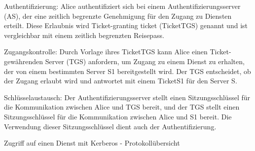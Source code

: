 \documentclass[a4paper]{article}
\begin{document}
\begin{multicols}{3}
\begin{itemize*}
\begin{itemize*}
                  \item Authentifizierung: Alice authentifiziert sich bei einem Authentifizierungsserver (AS), der eine zeitlich begrenzte Genehmigung für den Zugang zu Diensten erteilt. Diese Erlaubnis wird Ticket-granting ticket (TicketTGS) genannt und ist vergleichbar mit einem zeitlich begrenzten Reisepass.
                  \item Zugangskontrolle: Durch Vorlage ihres TicketTGS kann Alice einen Ticket-gewährenden Server (TGS) anfordern, um Zugang zu einem Dienst zu erhalten, der von einem bestimmten Server S1 bereitgestellt wird. Der TGS entscheidet, ob der Zugang erlaubt wird und antwortet mit einem TicketS1 für den Server S.
                  \item Schlüsselaustausch: Der Authentifizierungsserver stellt einen Sitzungsschlüssel für die Kommunikation zwischen Alice und TGS bereit, und der TGS stellt einen Sitzungsschlüssel für die Kommunikation zwischen Alice und S1 bereit. Die Verwendung dieser Sitzungsschlüssel dient auch der Authentifizierung.
            \end{itemize*}
      \end{itemize*}

      Zugriff auf einen Dienst mit Kerberos - Protokollübersicht


\end{multicols}
\end{document}
